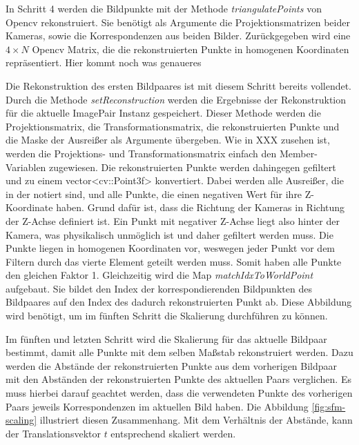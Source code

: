 In Schritt 4 werden die Bildpunkte mit der Methode \emph{triangulatePoints} von Opencv rekonstruiert.
Sie benötigt als Argumente die Projektionsmatrizen beider Kameras, sowie die Korrespondenzen aus beiden Bilder.  
Zurückgegeben wird eine $4\times N$ Opencv Matrix, die die rekonstruierten Punkte in homogenen Koordinaten repräsentiert.
Hier kommt noch was genaueres

Die Rekonstruktion des ersten Bildpaares ist mit diesem Schritt bereits vollendet.
Durch die Methode \emph{setReconstruction} werden die Ergebnisse der Rekonstruktion für die aktuelle ImagePair Instanz gespeichert.
Dieser Methode werden die Projektionsmatrix, die Transformationsmatrix, die rekonstruierten Punkte und die Maske der Ausreißer als Argumente übergeben. 
Wie in XXX zusehen ist, werden die Projektions- und Transformationsmatrix einfach den Member-Variablen zugewiesen.
Die rekonstruierten Punkte werden dahingegen gefiltert und zu einem vector<cv::Point3f> konvertiert.
Dabei werden alle Ausreißer, die in der notiert sind, und alle Punkte, die einen negativen Wert für ihre Z-Koordinate haben.  
Grund dafür ist, dass die Richtung der Kameras in Richtung der Z-Achse definiert ist.
Ein Punkt mit negativer Z-Achse liegt also hinter der Kamera, was physikalisch unmöglich ist und daher gefiltert werden muss.
Die Punkte liegen in homogenen Koordinaten vor, weswegen jeder Punkt vor dem Filtern durch das vierte Element geteilt werden muss.
Somit haben alle Punkte den gleichen Faktor 1.
Gleichzeitig wird die Map \emph{matchIdxToWorldPoint} aufgebaut.
Sie bildet den Index der korrespondierenden Bildpunkten des Bildpaares auf den Index des dadurch rekonstruierten Punkt ab.
Diese Abbildung wird benötigt, um im fünften Schritt die Skalierung durchführen zu können.

Im fünften und letzten Schritt wird die Skalierung für das aktuelle Bildpaar bestimmt, damit alle Punkte mit dem selben Maßstab rekonstruiert werden.  
Dazu werden die Abstände der rekonstruierten Punkte aus dem vorherigen Bildpaar mit den Abständen der rekonstruierten Punkte des aktuellen Paars verglichen.
Es muss hierbei darauf geachtet werden, dass die verwendeten Punkte des vorherigen Paars jeweils Korrespondenzen im aktuellen Bild haben.
Die Abbildung \cref{fig:sfm-scaling} illustriert diesen Zusammenhang.
Mit dem Verhältnis der Abstände, kann der Translationsvektor $t$ entsprechend skaliert werden.


